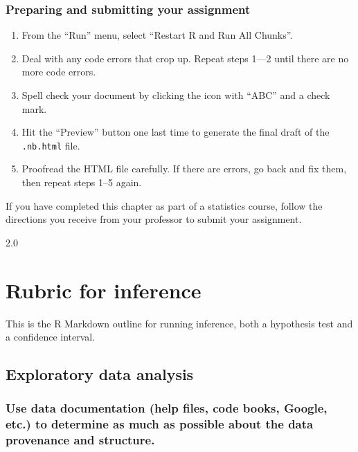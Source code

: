 \documentclass[
]{book}
\providecommand{\tightlist}{%
  \setlength{\itemsep}{0pt}\setlength{\parskip}{0pt}}
\begin{document}
\hypertarget{samp-dist-models-prep}{%
\subsection{Preparing and submitting your assignment}\label{samp-dist-models-prep}}

\begin{enumerate}
\def\labelenumi{\arabic{enumi}.}
\tightlist
\item
  From the ``Run'' menu, select ``Restart R and Run All Chunks''.
\item
  Deal with any code errors that crop up. Repeat steps 1---2 until there are no more code errors.
\item
  Spell check your document by clicking the icon with ``ABC'' and a check mark.
\item
  Hit the ``Preview'' button one last time to generate the final draft of the \texttt{.nb.html} file.
\item
  Proofread the HTML file carefully. If there are errors, go back and fix them, then repeat steps 1--5 again.
\end{enumerate}

If you have completed this chapter as part of a statistics course, follow the directions you receive from your professor to submit your assignment.

\hypertarget{appendix-appendix}{%
\appendix}


2.0

\hypertarget{appendix-rubric}{%
\chapter{Rubric for inference}\label{appendix-rubric}}

This is the R Markdown outline for running inference, both a hypothesis test and a confidence interval.

\hypertarget{exploratory-data-analysis-2}{%
\section*{Exploratory data analysis}\label{exploratory-data-analysis-2}}

\hypertarget{use-data-documentation-help-files-code-books-google-etc.-to-determine-as-much-as-possible-about-the-data-provenance-and-structure.-2}{%
\subsection*{Use data documentation (help files, code books, Google, etc.) to determine as much as possible about the data provenance and structure.}\label{use-data-documentation-help-files-code-books-google-etc.-to-determine-as-much-as-possible-about-the-data-provenance-and-structure.-2}}
\end{document}

